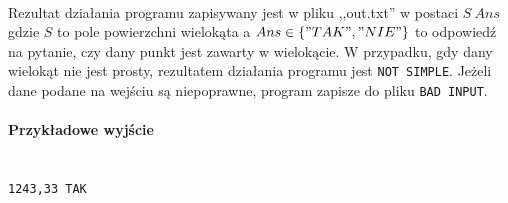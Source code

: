\documentclass{article}
\begin{document}
\paragraph{}
Rezultat działania programu zapisywany jest w pliku ,,out.txt'' w postaci \(S\ Ans\) gdzie \(S\) to pole powierzchni wielokąta a \(Ans\in\{"TAK","NIE"\}\) to odpowiedź na pytanie, czy dany punkt jest zawarty w wielokącie. W przypadku, gdy dany wielokąt nie jest prosty, rezultatem działania programu jest \texttt{NOT SIMPLE}. Jeżeli dane podane na wejściu są niepoprawne, program zapisze do pliku \texttt{BAD INPUT}.

\paragraph{Przykładowe wyjście} \mbox{}\\
\texttt{1243,33 TAK}
\end{document}
